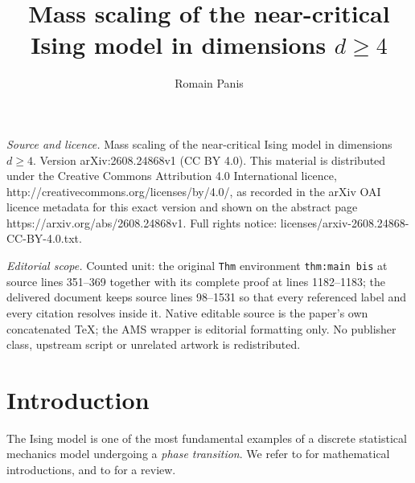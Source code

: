 \documentclass[10pt,a4paper]{amsart}
\numberwithin{equation}{section}
\begin{document}
\title[Mass scaling of the near-critical Ising model in dimensions ]{Mass scaling of the near-critical Ising model in dimensions $d\geq 4$}
\author{Romain Panis}
\date{}
\maketitle
\noindent\emph{Source and licence.} Mass scaling of the near-critical Ising model in dimensions $d\geq 4$. Version arXiv:2608.24868v1 (CC BY 4.0). This material is distributed under the Creative Commons Attribution 4.0 International licence, http://creativecommons.org/licenses/by/4.0/, as recorded in the arXiv OAI licence metadata for this exact version and shown on the abstract page https://arxiv.org/abs/2608.24868v1. Full rights notice: licenses/arxiv-2608.24868-CC-BY-4.0.txt.\par\smallskip
\noindent\textit{Editorial scope.} Counted unit: the original \texttt{Thm} environment \texttt{thm:main bis} at source lines 351--369 together with its complete proof at lines 1182--1183; the delivered document keeps source lines 98--1531 so that every referenced label and every citation resolves inside it. Native editable source is the paper's own concatenated TeX; the AMS wrapper is editorial formatting only. No publisher class, upstream script or unrelated artwork is redistributed.
\section{Introduction}

The Ising model is one of the most fundamental examples of a discrete statistical mechanics model undergoing a \emph{phase transition}. We refer to \cite{FriedliVelenikIntroStatMech2017,DuminilLecturesOnIsingandPottsModels2019} for mathematical introductions, and to \cite{DuminilreviewIsing} for a review. 

\vspace{4pt}
\end{document}
